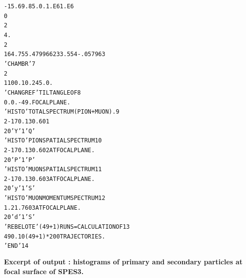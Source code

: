 \begin{alltt}
  -15.  69.       85.  0.    1.E6  1.E6                                         
  0                                                                             
  2                                                                             
  4.                                                                            
  2                                                                             
  164.755 .479966 233.554 -.057963                                              
  'CHAMBR'                                                               7      
  2                                                                             
  1   100. 10. 245.  0.                                                         
  'CHANGREF'                          TILT  ANGLE  OF                    8      
  0.   0.   -49.                      FOCAL  PLANE.                             
  'HISTO'                             TOTAL  SPECTRUM (PION + MUON).     9      
  2  -170.  130.  60  1                                                         
  20  'Y'  1  'Q'                                                               
  'HISTO'                             PION  SPATIAL  SPECTRUM           10      
  2  -170.  130.  60  2               AT  FOCAL  PLANE.                         
  20  'P'  1  'P'                                                               
  'HISTO'                             MUON  SPATIAL  SPECTRUM           11      
  2  -170.  130.  60  3               AT  FOCAL  PLANE.                         
  20  'y'  1  'S'                                                               
  'HISTO'                             MUON  MOMENTUM  SPECTRUM          12      
  1    .2   1.7   60  3               AT  FOCAL  PLANE.                         
  20  'd'  1  'S'                                                               
  'REBELOTE'                          (49+1)  RUNS =  CALCULATION  OF   13      
  49  0.1  0                          (49+1)*200  TRAJECTORIES.                 
  'END'                                                                 14      
\end{alltt}



\clearpage
\tiny
\twocolumn
\noindent \textbf{\normalsize Excerpt of \zgoubi output : histograms of primary and secondary particles at focal surface of SPES3.}

